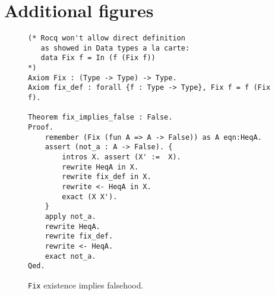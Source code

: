 \documentclass[sigplan,nonacm]{acmart}
\begin{document}



\appendix

\section{Additional figures}

\begin{figure}[H]
\begin{lstlisting}[language=Coq]
(* Rocq won't allow direct definition
   as showed in Data types a la carte:
   data Fix f = In (f (Fix f))
*)
Axiom Fix : (Type -> Type) -> Type.
Axiom fix_def : forall {f : Type -> Type}, Fix f = f (Fix f).

Theorem fix_implies_false : False. 
Proof.
    remember (Fix (fun A => A -> False)) as A eqn:HeqA.
    assert (not_a : A -> False). { 
        intros X. assert (X' :=  X).
        rewrite HeqA in X.
        rewrite fix_def in X.
        rewrite <- HeqA in X.
        exact (X X').
    }
    apply not_a.
    rewrite HeqA.
    rewrite fix_def.
    rewrite <- HeqA.
    exact not_a.
Qed.
\end{lstlisting}
\caption{\texttt{Fix} existence implies falsehood.}
  \label{appendix:false_proof}
\end{figure}
\end{document}
